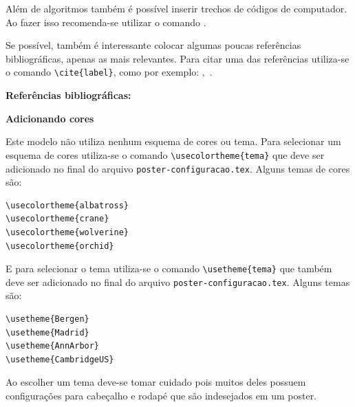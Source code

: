 \documentclass[]{beamer}
\begin{document}
\begin{frame}[t,fragile]
\begin{columns}[t]
\begin{column}{0.4\textwidth}
      Além de algoritmos também é possível inserir trechos de códigos de
      computador. Ao fazer isso recomenda-se utilizar o comando
      \lstinline++.
      

      Se possível, também é interessante colocar algumas poucas referências
      bibliográficas, apenas as mais relevantes. Para citar uma das referências
      utiliza-se o comando \lstinline+\cite{label}+, como por exemplo:
      \cite{Bailey},~\cite{Bay1}.

      \textbf{Referências bibliográficas:}

      \printbibliography

      \textbf{Adicionando cores}

      Este modelo não utiliza nenhum esquema de cores ou tema. Para selecionar
      um esquema de cores utiliza-se o comando \lstinline+\usecolortheme{tema}+
      que deve ser adicionado no final do arquivo
      \lstinline+poster-configuracao.tex+. Alguns temas de cores são:
      \begin{lstlisting}
\usecolortheme{albatross}
\usecolortheme{crane}
\usecolortheme{wolverine}
\usecolortheme{orchid}
      \end{lstlisting}
      E para selecionar o tema utiliza-se o comando
      \lstinline+\usetheme{tema}+ que também deve ser adicionado no final do
      arquivo \lstinline+poster-configuracao.tex+. Alguns temas são:
      \begin{lstlisting}
\usetheme{Bergen}
\usetheme{Madrid}
\usetheme{AnnArbor}
\usetheme{CambridgeUS}
      \end{lstlisting}
      Ao escolher um tema deve-se tomar cuidado pois muitos deles possuem
      configurações para cabeçalho e rodapé que são indesejados em um poster.


\end{column}
\end{columns}
\end{frame}
\end{document}
